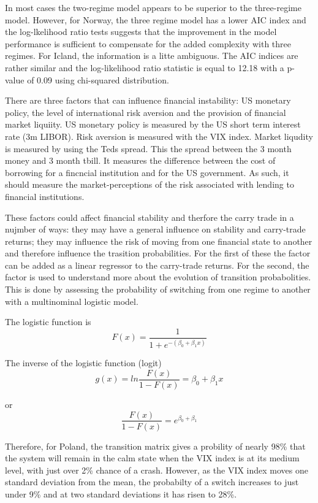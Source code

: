 \documentclass[12pt, a4paper, oneside]{article} %
\begin{document}
In most cases the two-regime model appears to be superior to the three-regime model.  However, for Norway, the three regime model has a lower AIC index and the log-lkelihood ratio tests suggests that the improvement in the model performance is sufficient to compensate for the added complexity with three regimes.  For Icland, the information is a litte ambiguous.  The AIC indices are rather similar and the log-likelihood ratio statistic is equal to 12.18 with a p-value of 0.09 using chi-squared distribution. 

There are three factors that can influence financial instability:  US monetary policy, the level of international risk aversion and the provision of financial market liquiity.  US monetary policy is measured by the US short term interest rate (3m LIBOR).  Risk aversion is measured with the VIX index.  Market liqudity is measured by using the Teds spread.  This the spread between the 3 month money and 3 month tbill.  It measures the difference between the cost of borrowing for a fincncial institution and for the US government. As such, it should measure the market-perceptions of the risk associated with lending  to financial institutions.   

These factors could affect financial stability and therfore the carry trade in a nujmber of ways:  they may have a general influence on stability and carry-trade returns; they may influence the risk of moving from one financial state to another and therefore influence the trasition probabilities. For the first of these the factor can be added as a linear regressor to the carry-trade returns.  For the second, the factor is used to understand more about the evolution of transition probabolities. This is done by assessing the probability of switching from one regime to another with a multinominal logistic model.  


The logistic function is 
\begin{equation}
F(x)  = \frac{1}{1 + e^{-(\beta_0 + \beta_1 x)}}
\end{equation}

The inverse of the logistic function (logit)
\begin{equation}
g(x) = ln\frac{F(x)}{1-F(x)} = \beta_0 +\beta_1x
\end{equation}

or 
\begin{equation}
\frac{F(x)}{1 - F(x)} = e^{\beta_0 + \beta_1}
\end{equation}

Therefore, for Poland, the transition matrix gives a probility of nearly 98\% that the system will remain in the calm state when the VIX index is at its medium level, with just over 2\% chance of a crash.  However, as the VIX index moves one standard deviation from the mean, the probabilty of a switch increases to just under 9\% and at two standard deviations it has risen to 28\%.  
\end{document}
